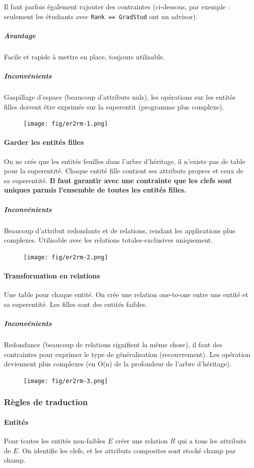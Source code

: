 \documentclass[a4paper]{article}
\begin{document}
Il faut parfois également rajouter des contraintes (ci-dessous, par exemple :
seulement les étudiants avec \texttt{Rank == GradStud} ont un advisor).
\subparagraph{Avantage}
Facile et rapide à mettre en place, toujours utilisable.
\subparagraph{Inconvénients}
Gaspillage d'espace (beaucoup d'attributs nuls), les opérations sur les entités
filles doivent être exprimée sur la superentit (programme plus complexe).
\begin{figure}[H]
    \center
    \texttt{[image: fig/er2rm-1.png]}
\end{figure}

\paragraph{Garder les entités filles}
On ne crée que les entités feuilles dans l'arbre d'héritage, il n'existe pas de
table pour la superentité. Chaque entité fille contient ses attributs propres et
ceux de sa superentité. \textbf{Il faut garantir avec une contrainte que les
clefs sont uniques parmis l'ensemble de toutes les entités filles.}
\subparagraph{Inconvénients}
Beaucoup d'attribut redondants et de relations, rendant les applications plus complexes.
Utilisable avec les relations totales-exclusives uniquement.
\begin{figure}[H]
    \center
    \texttt{[image: fig/er2rm-2.png]}
\end{figure}

\paragraph{Transformation en relations}
Une table pour chaque entité. On crée une relation one-to-one entre une entité
et sa superentité. Les filles sont des entités faibles.
\subparagraph{Inconvénients}
Redondance (beaucoup de relations signifient la même chose), il faut des contraintes
pour exprimer le type de généralisation (recouvrement). Les opération deviennent plus
complexes (en O(n) de la profondeur de l'arbre d'héritage).
\begin{figure}[H]
    \center
    \texttt{[image: fig/er2rm-3.png]}
\end{figure}

\subsubsection{Règles de traduction}
\paragraph{Entités}
Pour toutes les entités non-faibles $E$ créer une relation $R$ qui a tous les attributs
de $E$. On identifie les clefs, et les attributs composites sont stocké champ par champ.
\end{document}
